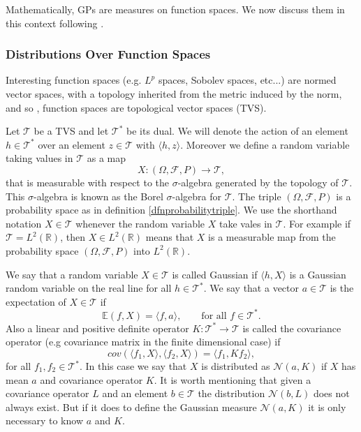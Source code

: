 \documentclass[12pt]{book}
\newcommand{\E}{\mathbb{E}} %
\newcommand{\tvs}{\mathscr{T}} %
\begin{document}
Mathematically, GPs are measures on function spaces. We now discuss them in this
context following \cite{lifshits2012lectures}.




\subsubsection{Distributions Over Function Spaces}
Interesting function spaces (e.g. $L^{p}$ spaces, Sobolev spaces, etc...) are 
normed vector spaces, with a topology inherited from the metric induced by the norm, and so 
, function spaces are topological vector spaces (TVS). 

Let $\mathscr{T}$ be a TVS and  let $\mathscr{T}^{*}$ be its dual. We will denote the action of an 
element $h\in\tvs^{*}$ over an element $z\in\tvs$ with $\langle h,z\rangle$. Moreover 
we  define a random variable taking values in $\tvs$ as a map 
\begin{equation*}
X:(\Omega,\mathscr{F},P)\longrightarrow\tvs,
\end{equation*}
that is measurable with respect to the $\sigma$-algebra generated by the topology
of $\tvs$. This $\sigma$-algebra is known as the Borel $\sigma$-algebra for $\tvs$.
The triple $(\Omega,\mathscr{F},P)$ is a probability space as in definition \ref{dfnprobabilitytriple}. 
We use the shorthand notation  $X\in\tvs$ whenever the random variable $X$ take vales in $\tvs$. 
For example if $\tvs=L^{2}(\mathbb{R})$,  then  $X\in L^{2}(\mathbb{R})$ means that $X$ is a measurable
map from the probability space $(\Omega,\mathscr{F},P)$ into $L^{2}(\mathbb{R})$.

We say that a random variable $X\in\tvs$ is called Gaussian if $\langle h,X\rangle$ is
a Gaussian random variable on the real line for all $h\in\tvs^{*}$. We say that a vector $a\in\tvs$ is the 
expectation of $X\in\tvs$ if 
\begin{equation*}
\E(f,X)=\langle f, a\rangle,\qquad\text{for all }f\in\tvs^{*}.
\end{equation*}
Also a linear and positive definite operator $K:\tvs^{*}\longrightarrow \tvs$ 
is called the covariance operator (e.g covariance
matrix in the finite dimensional case) if
\begin{equation*}
cov(\langle f_{1},X\rangle,\langle f_{2},X\rangle)=\langle f_{1},Kf_{2}\rangle,
\end{equation*}
for all $f_{1},f_{2}\in\tvs^{*}$. In this case we say that $X$ is distributed as 
$\mathcal{N}(a,K)$ if  $X$ has mean $a$ and covariance operator $K$. It is worth mentioning
that given a covariance operator $L$ and an element $b\in\tvs$ the distribution $\mathcal{N}(b,L)$
does not always exist. But if it does to define the  Gaussian measure $\mathcal{N}(a,K)$ it is
only necessary to know $a$ and $K$.
\newline
\end{document}
